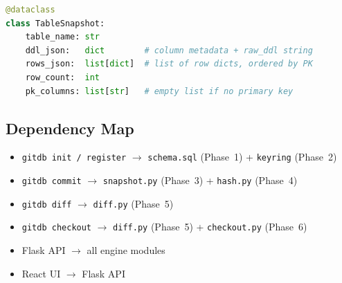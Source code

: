 \documentclass[12pt, a4paper]{article}
\begin{document}
\begin{tcolorbox}[commandbox, title=\texttt{TableSnapshot} --- Week 1 Contract (engine/snapshot.py)]
\begin{lstlisting}[language=Python]
@dataclass
class TableSnapshot:
    table_name: str
    ddl_json:   dict        # column metadata + raw_ddl string
    rows_json:  list[dict]  # list of row dicts, ordered by PK
    row_count:  int
    pk_columns: list[str]   # empty list if no primary key
\end{lstlisting}
\end{tcolorbox}

\subsection{Dependency Map}

\begin{tcolorbox}[infobox]
\begin{itemize}[leftmargin=1.5em, itemsep=0.2em]
    \item \texttt{gitdb init / register} $\to$ \texttt{schema.sql}
    (Phase~1) + \texttt{keyring} (Phase~2)
    \item \texttt{gitdb commit} $\to$ \texttt{snapshot.py} (Phase~3)
    + \texttt{hash.py} (Phase~4)
    \item \texttt{gitdb diff} $\to$ \texttt{diff.py} (Phase~5)
    \item \texttt{gitdb checkout} $\to$ \texttt{diff.py} (Phase~5)
    + \texttt{checkout.py} (Phase~6)
    \item Flask API $\to$ all engine modules
    \item React UI $\to$ Flask API
\end{itemize}
\end{tcolorbox}
\end{document}
